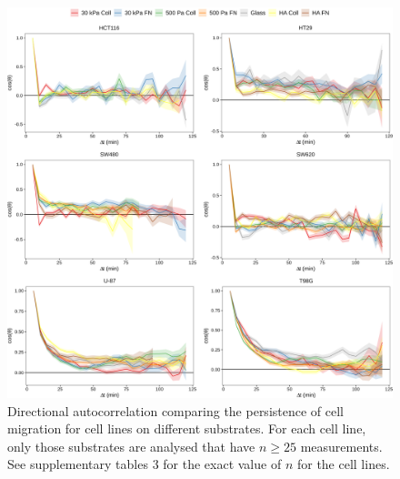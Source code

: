 \documentclass[11pt,letterpaper,english,oneside]{article} %
\begin{document}
\begin{figure}[H]
    \hspace*{-0.8cm}
    \centering
    \includegraphics{../Figures/Supplementary_Figures17_21/supplementary_figure21.png}
    \caption{Directional autocorrelation comparing the persistence of cell migration for cell lines on different substrates.
    For each cell line, only those substrates are analysed that have $n \geq 25$ measurements.
    See supplementary tables 3 for the exact value of $n$ for the cell lines.}
    \label{fig:fig21}
\end{figure}
\end{document}
